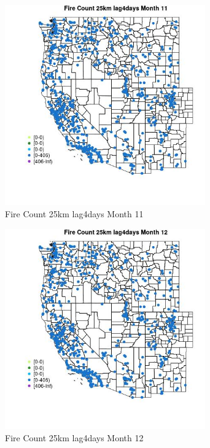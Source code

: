 \begin{figure} 
\centering  
\includegraphics[width=0.77\textwidth]{Code_Outputs/Report_ML_input_PM25_Step4_part_f_de_duplicated_aveswNAs_MapObsMo11Fire_Count_25km_lag4days.jpg} 
\caption{\label{fig:Report_ML_input_PM25_Step4_part_f_de_duplicated_aveswNAsMapObsMo11Fire_Count_25km_lag4days}Fire Count 25km lag4days Month 11} 
\end{figure} 
 

\begin{figure} 
\centering  
\includegraphics[width=0.77\textwidth]{Code_Outputs/Report_ML_input_PM25_Step4_part_f_de_duplicated_aveswNAs_MapObsMo12Fire_Count_25km_lag4days.jpg} 
\caption{\label{fig:Report_ML_input_PM25_Step4_part_f_de_duplicated_aveswNAsMapObsMo12Fire_Count_25km_lag4days}Fire Count 25km lag4days Month 12} 
\end{figure} 
 

